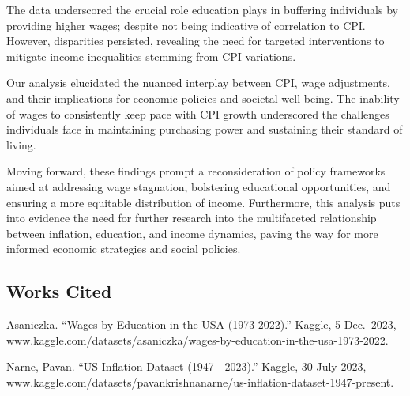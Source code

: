 \documentclass[
  letterpaper,
  DIV=11,
  numbers=noendperiod]{scrartcl}
\begin{document}
The data underscored the crucial role education plays in buffering
individuals by providing higher wages; despite not being indicative of
correlation to CPI. However, disparities persisted, revealing the need
for targeted interventions to mitigate income inequalities stemming from
CPI variations.

Our analysis elucidated the nuanced interplay between CPI, wage
adjustments, and their implications for economic policies and societal
well-being. The inability of wages to consistently keep pace with CPI
growth underscored the challenges individuals face in maintaining
purchasing power and sustaining their standard of living.

Moving forward, these findings prompt a reconsideration of policy
frameworks aimed at addressing wage stagnation, bolstering educational
opportunities, and ensuring a more equitable distribution of income.
Furthermore, this analysis puts into evidence the need for further
research into the multifaceted relationship between inflation,
education, and income dynamics, paving the way for more informed
economic strategies and social policies.

\hypertarget{works-cited}{%
\subsection{Works Cited}\label{works-cited}}

Asaniczka. ``Wages by Education in the USA (1973-2022).'' Kaggle, 5
Dec.~2023,
www.kaggle.com/datasets/asaniczka/wages-by-education-in-the-usa-1973-2022.

Narne, Pavan. ``US Inflation Dataset (1947 - 2023).'' Kaggle, 30 July
2023,
www.kaggle.com/datasets/pavankrishnanarne/us-inflation-dataset-1947-present.
\end{document}
